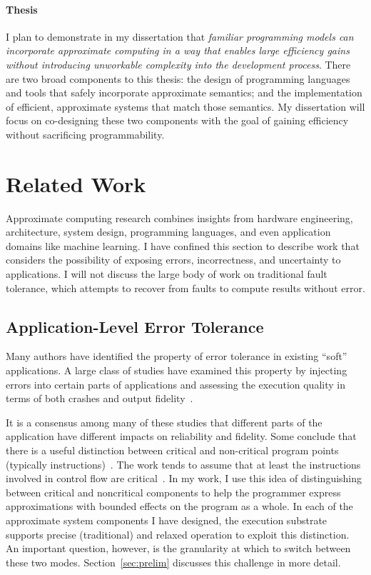 \paragraph{Thesis}

I plan to demonstrate in my dissertation that \textit{familiar programming
models can incorporate approximate computing in a way that enables large
efficiency gains without introducing unworkable complexity into the
development process}. There are two broad components to this thesis: the
design of programming languages and tools that safely incorporate approximate
semantics; and the implementation of efficient, approximate systems that match
those semantics. My dissertation will focus on co-designing these two
components with the goal of gaining efficiency without sacrificing
programmability.


\section{Related Work}

Approximate computing research combines insights from hardware engineering,
architecture, system design, programming languages, and even application
domains like machine learning. I have confined this section to describe work
that considers the possibility of exposing errors, incorrectness, and
uncertainty to applications. I will not discuss the large body of work on
traditional fault tolerance, which attempts to recover from faults to compute
results without error.

\subsection{Application-Level Error Tolerance}
\label{sec:related:studies}

Many authors have identified the property of error tolerance in existing
``soft''
applications. A large class of studies have examined this property by
injecting errors into certain parts of applications and assessing the
execution quality in terms of both crashes and output fidelity~\cite{li06,
li07, li08, dekruijf-selse09, wong-selse06, palem-arcs, freton, besteffort,
yeh, thaker-iiswc06, efc, llfi}.

It is a consensus among many of these studies that different parts of the
application have different impacts on reliability and fidelity. Some conclude
that there is a useful distinction between critical and non-critical program
points (typically instructions)~\cite{palem-arcs, thaker-iiswc06, flikker,
llfi}.
The work tends to assume that at least the instructions involved in control
flow are critical~\cite{thaker-iiswc06}. In my work, I use this idea of
distinguishing between critical and noncritical components to help the
programmer express approximations with bounded effects on the program as a
whole. In each of the approximate system components I have designed, the
execution substrate supports precise (traditional) and relaxed operation to
exploit this distinction. An important question, however, is the granularity
at which to switch between these two modes. Section~\ref{sec:prelim} discusses
this challenge in more detail.

